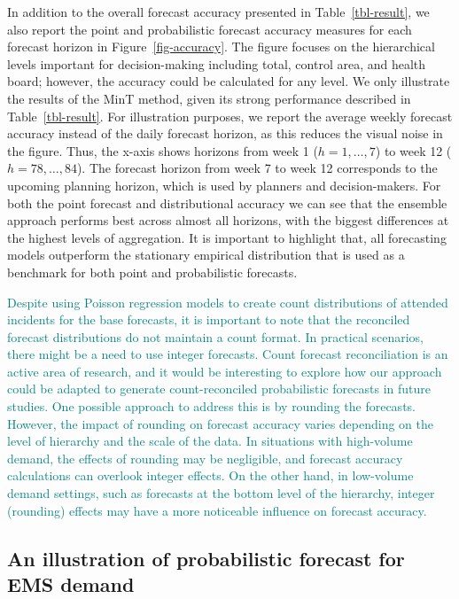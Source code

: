 \documentclass[
  authoryear,
  preprint,
  3p]{elsarticle}
\begin{document}
In addition to the overall forecast accuracy presented in
Table~\ref{tbl-result}, we also report the point and probabilistic
forecast accuracy measures for each forecast horizon in
Figure~\ref{fig-accuracy}. The figure focuses on the hierarchical levels
important for decision-making including total, control area, and health
board; however, the accuracy could be calculated for any level. We only
illustrate the results of the MinT method, given its strong performance
described in Table~\ref{tbl-result}. For illustration purposes, we
report the average weekly forecast accuracy instead of the daily
forecast horizon, as this reduces the visual noise in the figure. Thus,
the x-axis shows horizons from week 1 (\(h= 1,\dots,7\)) to week 12
(\(h= 78,\dots,84\)). The forecast horizon from week 7 to week 12
corresponds to the upcoming planning horizon, which is used by planners
and decision-makers. For both the point forecast and distributional
accuracy we can see that the ensemble approach performs best across
almost all horizons, with the biggest differences at the highest levels
of aggregation. It is important to highlight that, all forecasting
models outperform the stationary empirical distribution that is used as
a benchmark for both point and probabilistic forecasts.

\textcolor{teal}{Despite using Poisson regression models to create count distributions of attended incidents for the base forecasts, it is important to note that the reconciled forecast distributions do not maintain a count format. In practical scenarios, there might be a need to use integer forecasts. Count forecast reconciliation is an active area of research, and it would be interesting to explore how our approach could be adapted to generate count-reconciled probabilistic forecasts in future studies. One possible approach to address this is by rounding the forecasts. However, the impact of rounding on forecast accuracy varies depending on the level of hierarchy and the scale of the data. In situations with high-volume demand, the effects of rounding may be negligible, and forecast accuracy calculations can overlook integer effects. On the other hand, in low-volume demand settings, such as forecasts at the bottom level of the hierarchy, integer (rounding) effects may have a more noticeable influence on forecast accuracy.}

\subsection{An illustration of probabilistic forecast for EMS
demand}\label{an-illustration-of-probabilistic-forecast-for-ems-demand}
\end{document}

